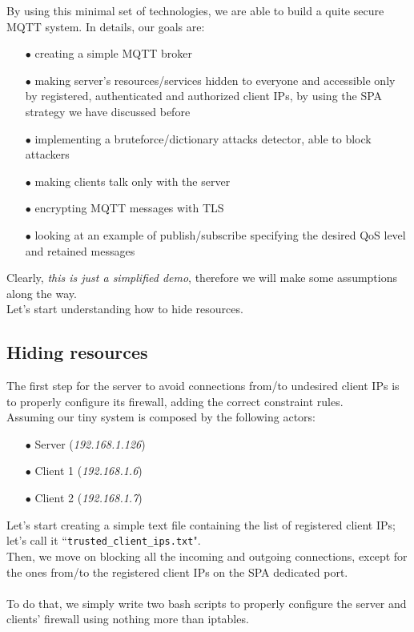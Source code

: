 \documentclass[12pt]{report}
\begin{document}
{{By using this minimal set of technologies, we are able to build a quite secure MQTT system. In details, our goals are:\bigskip
\begin{itemize}
\setlength{\itemindent}{+4mm}
\item[$\bullet$] creating a simple MQTT broker
\item[$\bullet$] making server's resources/services hidden to everyone and accessible only by registered, authenticated and authorized client IPs, by using the SPA strategy we have discussed before
\item[$\bullet$] implementing a bruteforce/dictionary attacks detector, able to block attackers
\item[$\bullet$] making clients talk only with the server
\item[$\bullet$] encrypting MQTT messages with TLS
\item[$\bullet$] looking at an example of publish/subscribe specifying the desired QoS level and retained messages\\
\end{itemize}

Clearly, \emph{this is just a simplified demo}, therefore we will make some assumptions along the way.\\

Let's start understanding how to hide resources.

\subsection{Hiding resources}
\bigskip
The first step for the server to avoid connections from/to undesired client IPs is to properly configure its firewall, adding the correct constraint rules.\\
Assuming our tiny system is composed by the following actors:
\bigskip
\begin{itemize}
\setlength{\itemindent}{+4mm}
\item[$\bullet$] Server (\emph{192.168.1.126})
\item[$\bullet$] Client 1 (\emph{192.168.1.6})
\item[$\bullet$] Client 2 (\emph{192.168.1.7})\\
\end{itemize}

Let's start creating a simple text file containing the list of registered client IPs; let's call it ``\texttt{trusted\_client\_ips.txt}".\\
Then, we move on blocking all the incoming and outgoing connections, except for the ones from/to the registered client IPs on the SPA dedicated port.\\\\
To do that, we simply write two bash scripts to properly configure the server and clients' firewall using nothing more than iptables.

}}
\end{document}
